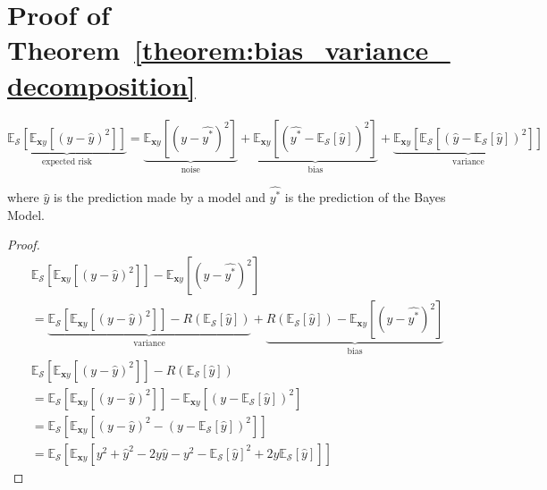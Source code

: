 \documentclass{article}
\begin{document}
\section{Proof of Theorem~\ref{theorem:bias_variance_decomposition}}
\label{appendix:bias_variance_decomposition}
\[
\underbrace{\mathbb{E}_{\mathcal{S}}\left[\mathbb{E}_{\mathbf{x}y}\left[(y - \hat{y})^2\right]\right]}_{\text{expected risk}} = \underbrace{\mathbb{E}_{\mathbf{x}y}\left[(y - \hat{y^*})^2\right]}_{\text{noise}} + \underbrace{\mathbb{E}_{\mathbf{x}y}\left[\left(\hat{y^*} - \mathbb{E}_{\mathcal{S}}[\hat{y}]\right)^2\right]}_{\text{bias}} + \underbrace{\mathbb{E}_{\mathbf{x}y}\left[\mathbb{E}_{\mathcal{S}}\left[(\hat{y} - \mathbb{E}_{\mathcal{S}}[\hat{y}])^2\right]\right]}_{\text{variance}}
\]
\begin{center}
    \begin{minipage}{0.8\linewidth}
        \small
        where $\hat{y}$ is the prediction made by a model and $\hat{y^*}$ is the prediction of the Bayes Model. 
    \end{minipage}
    \begin{proof}
        \begin{align*}
            &\mathbb{E}_{\mathcal{S}}\left[\mathbb{E}_{\mathbf{x}y}\left[(y - \hat{y})^2\right]\right] - \mathbb{E}_{\mathbf{x}y}\left[(y - \hat{y^*})^2\right]
            \\
            &= \underbrace{\mathbb{E}_{\mathcal{S}}\left[\mathbb{E}_{\mathbf{x}y}\left[(y - \hat{y})^2\right]\right] - R(\mathbb{E}_{\mathcal{S}}\left[\hat{y}\right])}_{\text{variance}} + \underbrace{R(\mathbb{E}_{\mathcal{S}}\left[\hat{y}\right]) - \mathbb{E}_{\mathbf{x}y}\left[(y - \hat{y^*})^2\right]}_{\text{bias}}
            \\
            &\mathbb{E}_{\mathcal{S}}\left[\mathbb{E}_{\mathbf{x}y}\left[(y - \hat{y})^2\right]\right] - R(\mathbb{E}_{\mathcal{S}}\left[\hat{y}\right])
            \\
            &= \mathbb{E}_{\mathcal{S}}\left[\mathbb{E}_{\mathbf{x}y}\left[(y - \hat{y})^2\right]\right] - \mathbb{E}_{\mathbf{x}y}\left[(y - \mathbb{E}_{\mathcal{S}}[\hat{y}])^2\right]
            \\
            &= \mathbb{E}_{\mathcal{S}}\left[\mathbb{E}_{\mathbf{x}y}\left[(y - \hat{y})^2 - (y - \mathbb{E}_{\mathcal{S}}[\hat{y}])^2\right]\right]
            \\
            &= \mathbb{E}_{\mathcal{S}}\left[\mathbb{E}_{\mathbf{x}y}\left[y^2 + \hat{y}^2 - 2y\hat{y} - y^2 - \mathbb{E}_{\mathcal{S}}[\hat{y}]^2 + 2y\mathbb{E}_{\mathcal{S}}[\hat{y}]\right]\right]

\end{align*}
\end{proof}
\end{center}
\end{document}
